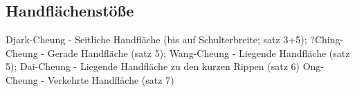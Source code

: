 \subsection{Handfl\"achenst\"o{\ss}e}

Djark-Cheung - Seitliche Handfl\"ache (bis auf Schulterbreite; satz 3+5);
?Ching-Cheung - Gerade Handfl\"ache (satz 5);
Wang-Cheung - Liegende Handfl\"ache (satz 5);
Dai-Cheung - Liegende Handfl\"ache zu den kurzen Rippen (satz 6)
Ong-Cheung - Verkehrte Handfl\"ache (satz 7)